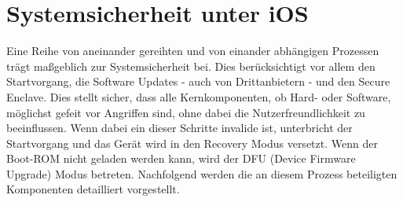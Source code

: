 \section{Systemsicherheit unter iOS}
	Eine Reihe von aneinander gereihten und von einander abhängigen Prozessen
	trägt maßgeblich zur Systemsicherheit bei. Dies berücksichtigt vor allem den
	Startvorgang, die Software Updates - auch von Drittanbietern - und den Secure
	Enclave. Dies stellt sicher, dass alle Kernkomponenten, ob Hard- oder
	Software, möglichst gefeit vor Angriffen sind, ohne dabei die
	Nutzerfreundlichkeit zu beeinflussen. Wenn dabei ein dieser Schritte invalide
	ist, unterbricht der Startvorgang und das Gerät wird in den Recovery Modus
	versetzt. Wenn der Boot-ROM nicht geladen werden kann, wird der DFU (Device
	Firmware Upgrade) Modus betreten. Nachfolgend werden die an diesem Prozess
	beteiligten Komponenten detailliert vorgestellt.
